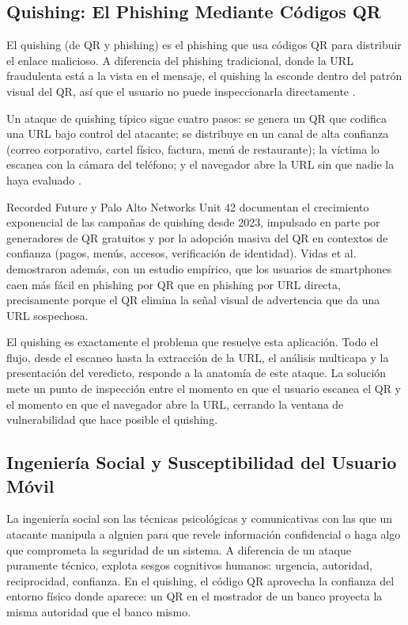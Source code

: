 \subsection{Quishing: El Phishing Mediante C\'odigos QR}

El quishing (de QR y phishing) es el phishing que usa c\'odigos QR para distribuir el enlace malicioso. A diferencia del phishing tradicional, donde la URL fraudulenta est\'a a la vista en el mensaje, el quishing la esconde dentro del patr\'on visual del QR, as\'i que el usuario no puede inspeccionarla directamente \cite{insikt2024qrcode,unit42_2023qr}.

Un ataque de quishing t\'ipico sigue cuatro pasos: se genera un QR que codifica una URL bajo control del atacante; se distribuye en un canal de alta confianza (correo corporativo, cartel f\'isico, factura, men\'u de restaurante); la v\'ictima lo escanea con la c\'amara del tel\'efono; y el navegador abre la URL sin que nadie la haya evaluado \cite{vidas2013qrishing}.

Recorded Future \cite{insikt2024qrcode} y Palo Alto Networks Unit 42 \cite{unit42_2023qr} documentan el crecimiento exponencial de las campa\~nas de quishing desde 2023, impulsado en parte por generadores de QR gratuitos y por la adopci\'on masiva del QR en contextos de confianza (pagos, men\'us, accesos, verificaci\'on de identidad). Vidas et al. \cite{vidas2013qrishing} demostraron adem\'as, con un estudio emp\'irico, que los usuarios de smartphones caen m\'as f\'acil en phishing por QR que en phishing por URL directa, precisamente porque el QR elimina la se\~nal visual de advertencia que da una URL sospechosa.

El quishing es exactamente el problema que resuelve esta aplicaci\'on. Todo el flujo, desde el escaneo hasta la extracci\'on de la URL, el an\'alisis multicapa y la presentaci\'on del veredicto, responde a la anatom\'ia de este ataque. La soluci\'on mete un punto de inspecci\'on entre el momento en que el usuario escanea el QR y el momento en que el navegador abre la URL, cerrando la ventana de vulnerabilidad que hace posible el quishing.

\subsection{Ingenier\'ia Social y Susceptibilidad del Usuario M\'ovil}

La ingenier\'ia social son las t\'ecnicas psicol\'ogicas y comunicativas con las que un atacante manipula a alguien para que revele informaci\'on confidencial o haga algo que comprometa la seguridad de un sistema. A diferencia de un ataque puramente t\'ecnico, explota sesgos cognitivos humanos: urgencia, autoridad, reciprocidad, confianza. En el quishing, el c\'odigo QR aprovecha la confianza del entorno f\'isico donde aparece: un QR en el mostrador de un banco proyecta la misma autoridad que el banco mismo.

